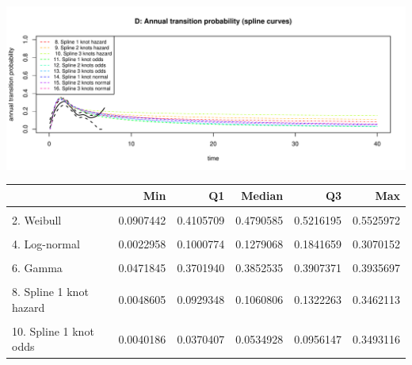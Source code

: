 \documentclass[]{article}
\begin{document}
\begin{flushleft}\includegraphics[height=0.29\textheight]{Images/validate_extrapolation3-4} \end{flushleft}

\begin{tabular}{lrrrrr}
\toprule
  & Min & Q1 & Median & Q3 & Max\\
\midrule
\cellcolor{gray!6}{1. Exponential} & \cellcolor{gray!6}{0.2449482} & \cellcolor{gray!6}{0.2449482} & \cellcolor{gray!6}{0.2449482} & \cellcolor{gray!6}{0.2449482} & \cellcolor{gray!6}{0.2449482}\\
2. Weibull & 0.0907442 & 0.4105709 & 0.4790585 & 0.5216195 & 0.5525972\\
\cellcolor{gray!6}{3. Gompertz} & \cellcolor{gray!6}{0.2169796} & \cellcolor{gray!6}{0.3698466} & \cellcolor{gray!6}{0.5818235} & \cellcolor{gray!6}{0.8071868} & \cellcolor{gray!6}{1.0000000}\\
4. Log-normal & 0.0022958 & 0.1000774 & 0.1279068 & 0.1841659 & 0.3070152\\
\cellcolor{gray!6}{5. Log-logistic} & \cellcolor{gray!6}{0.0305143} & \cellcolor{gray!6}{0.0571627} & \cellcolor{gray!6}{0.0832145} & \cellcolor{gray!6}{0.1494462} & \cellcolor{gray!6}{0.3207417}\\
6. Gamma & 0.0471845 & 0.3701940 & 0.3852535 & 0.3907371 & 0.3935697\\
\cellcolor{gray!6}{7. Generalised Gamma} & \cellcolor{gray!6}{0.0000317} & \cellcolor{gray!6}{0.0518395} & \cellcolor{gray!6}{0.0728961} & \cellcolor{gray!6}{0.1237607} & \cellcolor{gray!6}{0.3222943}\\
8. Spline 1 knot hazard & 0.0048605 & 0.0929348 & 0.1060806 & 0.1322263 & 0.3462113\\
\cellcolor{gray!6}{9. Spline 2 knots hazard} & \cellcolor{gray!6}{0.0027621} & \cellcolor{gray!6}{0.1183362} & \cellcolor{gray!6}{0.1309295} & \cellcolor{gray!6}{0.1552006} & \cellcolor{gray!6}{0.3471134}\\
10. Spline 1 knot odds & 0.0040186 & 0.0370407 & 0.0534928 & 0.0956147 & 0.3493116\\

\end{tabular}
\end{document}
